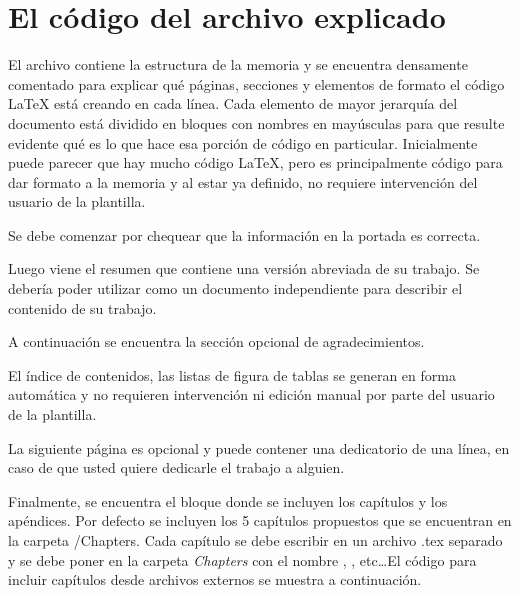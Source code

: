 
\section{El código del archivo  explicado}

El archivo  contiene la estructura de la memoria y se encuentra densamente comentado para explicar qué páginas, secciones y elementos de formato el código \LaTeX{} está creando en cada línea. Cada elemento de mayor jerarquía del documento está dividido en bloques con nombres en mayúsculas para que resulte evidente qué es lo que hace esa porción de código en particular. Inicialmente puede parecer que hay mucho código \LaTeX{}, pero es principalmente código para dar formato a la memoria y al estar ya definido, no requiere intervención del usuario de la plantilla.

Se debe comenzar por chequear que la información en la portada es correcta.

Luego viene el resumen que contiene una versión abreviada de su trabajo.  Se debería poder utilizar como un documento independiente para describir el contenido de su trabajo.

A continuación se encuentra la sección opcional de agradecimientos. 

El índice de contenidos, las listas de figura de tablas se generan en forma automática y no requieren intervención ni edición manual por parte del usuario de la plantilla. 

La siguiente página es opcional y puede contener una dedicatorio de una línea, en caso de que usted quiere dedicarle el trabajo a alguien.

Finalmente, se encuentra el bloque donde se incluyen los capítulos y los apéndices.  Por defecto se incluyen los 5 capítulos propuestos que se encuentran en la carpeta /Chapters. Cada capítulo se debe escribir en un archivo .tex separado y se debe poner en la carpeta \emph{Chapters} con el nombre , , etc\ldots El código para incluir capítulos desde archivos externos se muestra a continuación.

\begin{verbatim}
	
	 
	
	 
	 
\end{verbatim}

